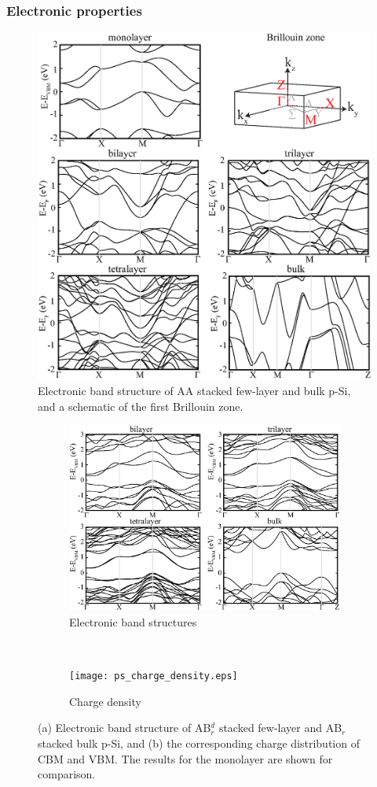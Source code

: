\subsubsection{Electronic properties}\label{elec}

\begin{figure}[htb]
\centering
\includegraphics[width=0.7\linewidth]{ps_AA_bands.eps}%
\caption{Electronic band structure of AA stacked few-layer and bulk p-Si, and a schematic of the first Brillouin zone. \label{fig:AA_bands}}
\end{figure}

\begin{figure}[htbp]
  \begin{subfigure}{\linewidth}
  \centering
    \includegraphics[width=0.7\linewidth]{ps_AB_bands.eps}%
    \captionsetup{singlelinecheck=true}
    \caption{Electronic band structures  \label{fig:AB_bands}}
  \end{subfigure} 
  \\
  \begin{subfigure}{\linewidth}
  \centering
    \texttt{[image: ps\_charge\_density.eps]}%
    \captionsetup{singlelinecheck=true}
    \caption{Charge density \label{fig:charge_density}}    
  \end{subfigure}
\caption{(a) Electronic band structure of AB$_r^d$ stacked few-layer and AB$_r$ stacked bulk p-Si, and (b) the corresponding charge distribution of CBM and VBM. The results for the monolayer are shown for comparison.}
\end{figure}

